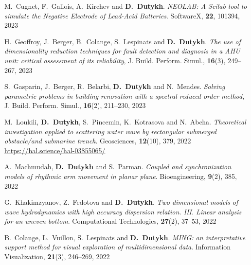 \begin{etaremune}
  \item M.~Cugnet, F.~Gallois, A.~Kirchev and \textbf{D.~Dutykh}. \textit{NEOLAB: A Scilab tool to simulate the Negative Electrode of Lead-Acid Batteries}. SoftwareX, \textbf{22}, 101394, 2023 %
  
  \item H.~Geoffroy, J.~Berger, B.~Colange, S.~Lespinats and \textbf{D.~Dutykh}. \textit{The use of dimensionality reduction techniques for fault detection and diagnosis in a AHU unit: critical assessment of its reliability}, J. Build. Perform. Simul., \textbf{16}(3), 249--267, 2023 %

  \item S.~Gasparin, J.~Berger, R.~Belarbi, \textbf{D.~Dutykh} and N.~Mendes. \textit{Solving parametric problems in building renovation with a spectral reduced-order method}, J. Build. Perform. Simul., \textbf{16}(2), 211--230, 2023 %


  
  \item M.~Loukili, \textbf{D.~Dutykh}, S.~Pincemin, K.~Kotrasova and N.~Abcha. \textit{Theoretical investigation applied to scattering water wave by rectangular submerged obstacle/and submarine trench}. Geosciences, \textbf{12}(10), 379, 2022 \\ %
  \url{https://hal.science/hal-03855065/}
  
  
  \item A.~Machmudah, \textbf{D.~Dutykh} and S.~Parman. \textit{Coupled and synchronization models of rhythmic arm movement in planar plane}. Bioengineering, \textbf{9}(2), 385, 2022 %
  
  \item G.~Khakimzyanov, Z.~Fedotova and \textbf{D.~Dutykh}. \textit{Two-dimensional models of wave hydrodynamics with high accuracy dispersion relation. III. Linear analysis for an uneven bottom}. Computational Technologies, \textbf{27}(2), 37--53, 2022 %
  
  \item B.~Colange, L.~Vuillon, S.~Lespinats and \textbf{D.~Dutykh}. \textit{MING: an interpretative support method for visual exploration of multidimensional data}. Information Visualization, \textbf{21}(3), 246--269, 2022 %
  

\end{etaremune}
